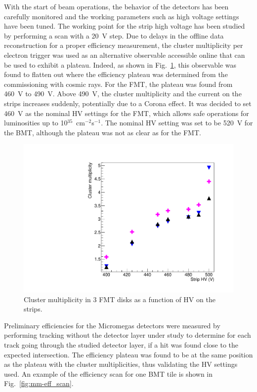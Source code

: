 With the start of beam operations, the behavior of the detectors has been carefully monitored and the working parameters
such as high voltage settings have been tuned. The working point for the strip high voltage has been studied by performing
a scan with a 20~V step. Due to delays in the offline data reconstruction for a proper efficiency measurement, the cluster
multiplicity per electron trigger was used as an alternative observable accessible online that can be used to exhibit a
plateau. Indeed, as shown in Fig.~\ref{fig:mm-fig15}, this observable was found to flatten out where the efficiency plateau
was determined from the commissioning with cosmic rays. For the FMT, the plateau was found from 460~V to 490~V. Above
490~V, the cluster multiplicity and the current on the strips increases suddenly, potentially due to a Corona effect. It was
decided to set 460~V as the nominal HV settings for the FMT, which allows safe operations for luminosities up to
10$^{35}$~cm$^{-2}$s$^{-1}$. The nominal HV setting was set to be 520~V for the BMT, although the plateau was not as
clear as for the FMT.  

\begin{figure}[htb]
 \includegraphics[width=1.0\columnwidth,keepaspectratio]{images/PseudoEfficiencies_ClusterMultiplicities_FMT_only3layers.pdf}
 \caption{Cluster multiplicity in 3 FMT disks as a function of HV on the strips.}
 \label{fig:mm-fig15}
\end{figure}

Preliminary efficiencies for the Micromegas detectors were measured by performing tracking without the detector layer
under study to determine for each track going through the studied detector layer, if a hit was found close to the expected
intersection. The efficiency plateau was found to be at the same position as the plateau with the cluster multiplicities, thus
validating the HV settings used. An example of the efficiency scan for one BMT tile is shown in Fig.~\ref{fig:mm-eff_scan}.

